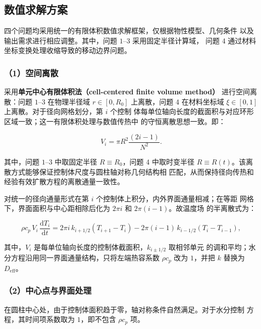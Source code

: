 \documentclass[withoutpreface,bwprint]{cumcmthesis}
\begin{document}
\subsection{数值求解方案}

四个问题均采用统一的有限体积数值求解框架，仅根据物性模型、几何条件
以及输出需求进行相应调整。其中，问题 $1$--$3$ 采用固定半径计算域，
问题 4 通过材料坐标变换处理收缩导致的移动边界问题。

\subsubsection*{（1）空间离散}

采用\textbf{单元中心有限体积法（cell-centered finite volume method）}
进行空间离散：问题 $1$--$3$ 在物理半径域 $r\in[0,R_0]$ 上离散，问题
4 在材料坐标域 $\xi\in[0,1]$ 上离散。对于径向网格划分，第 $i$ 个控制
体每单位轴向长度的截面积与对应环形区域一致；这一有限体积处理与数值传热中
的守恒离散思想一致\cite{tao2001,patankar1980}。即：

\begin{equation*}
  V_i=\pi R^2\frac{(2i-1)}{N^2}.
\end{equation*}

其中，问题 $1$--$3$ 中取固定半径 $R\equiv R_0$，问题 4 中取时变半径
$R\equiv R(t)$。该离散方式能够保证控制体尺度与圆柱轴对称几何结构相
匹配，从而保持径向传热和经验有效扩散方程的离散通量一致性。

对统一的径向通量形式在第 $i$ 个控制体上积分，内外界面通量相减；在等距
网格下，界面面积与中心距相除后化为 $2\pi i$ 和 $2\pi(i-1)$。故温度场
的半离散式为：

\begin{equation}
  \rho c_p\,V_i\,\frac{\mathrm dT_i}{\mathrm dt}
  =2\pi i\,k_{i+1/2}\left(T_{i+1}-T_i\right)
  -2\pi(i-1)\,k_{i-1/2}\left(T_i-T_{i-1}\right),
  \label{eq:fvm}
\end{equation}

其中，$V_i$ 是每单位轴向长度的控制体截面积，$k_{i\pm1/2}$ 取相邻单元
的调和平均；水分方程沿用同一界面通量结构，只将左端热容系数
$\rho c_p$ 改为 $1$，并把 $k$ 替换为 $D_{\mathrm{eff}}$。

\subsubsection*{（2）中心点与界面处理}

在圆柱中心处，由于控制体面积趋于零，轴对称条件自然满足。对于水分控制
方程，其时间项系数取为 $1$，即不包含 $\rho c_p$ 项。
\end{document}
